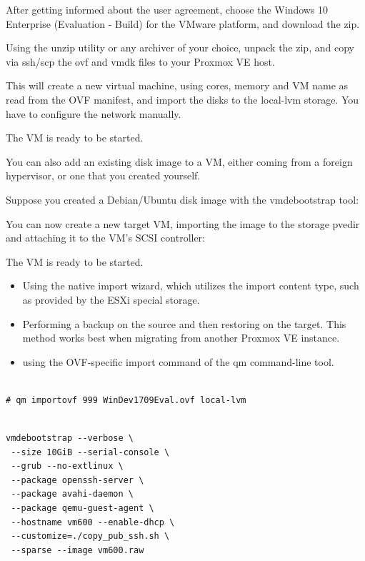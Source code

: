 After getting informed about the user agreement, choose the Windows 10 Enterprise (Evaluation - Build) for the VMware platform, and download the zip.

Using the unzip utility or any archiver of your choice, unpack the zip, and copy via ssh/scp the ovf and vmdk files to your Proxmox VE host.

This will create a new virtual machine, using cores, memory and VM name as read from the OVF manifest, and import the disks to the local-lvm storage. You have to configure the network manually.

The VM is ready to be started.

You can also add an existing disk image to a VM, either coming from a foreign hypervisor, or one that you created yourself.

Suppose you created a Debian/Ubuntu disk image with the vmdebootstrap tool:

You can now create a new target VM, importing the image to the storage pvedir and attaching it to the VM’s SCSI controller:

The VM is ready to be started.

\begin{itemize}[leftmargin=2cm]

	\item Using the native import wizard, which utilizes the import content type, such as provided by the ESXi special storage.

	\item Performing a backup on the source and then restoring on the target. This method works best when migrating from another Proxmox VE instance.

	\item using the OVF-specific import command of the qm command-line tool.

\end{itemize}

\begin{lstlisting}

# qm importovf 999 WinDev1709Eval.ovf local-lvm

\end{lstlisting}

\begin{lstlisting}

vmdebootstrap --verbose \
 --size 10GiB --serial-console \
 --grub --no-extlinux \
 --package openssh-server \
 --package avahi-daemon \
 --package qemu-guest-agent \
 --hostname vm600 --enable-dhcp \
 --customize=./copy_pub_ssh.sh \
 --sparse --image vm600.raw

\end{lstlisting}

